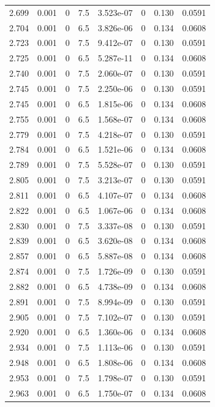 \documentclass[preview]{standalone}
\begin{document}
{{{{{{{{\begin{tabular}{L{1.2cm}C{1.2cm} C{0.3cm}C{0.5cm} C{1.4cm}C{1.4cm} C{1.4cm}C{1.4cm}}
  2.699  &  0.001  & 0     & 7.5 &  3.523e-07  & 0  & 0.130 &  0.0591   \\ 
  2.704  &  0.001  & 0     & 6.5 &  3.826e-06  & 0  & 0.134 &  0.0608   \\ 
  2.723  &  0.001  & 0     & 7.5 &  9.412e-07  & 0  & 0.130 &  0.0591   \\ 
  2.725  &  0.001  & 0     & 6.5 &  5.287e-11  & 0  & 0.134 &  0.0608   \\ 
  2.740  &  0.001  & 0     & 7.5 &  2.060e-07  & 0  & 0.130 &  0.0591   \\ 
  2.745  &  0.001  & 0     & 7.5 &  2.250e-06  & 0  & 0.130 &  0.0591   \\ 
  2.745  &  0.001  & 0     & 6.5 &  1.815e-06  & 0  & 0.134 &  0.0608   \\ 
  2.755  &  0.001  & 0     & 6.5 &  1.568e-07  & 0  & 0.134 &  0.0608   \\ 
  2.779  &  0.001  & 0     & 7.5 &  4.218e-07  & 0  & 0.130 &  0.0591   \\ 
  2.784  &  0.001  & 0     & 6.5 &  1.521e-06  & 0  & 0.134 &  0.0608   \\ 
  2.789  &  0.001  & 0     & 7.5 &  5.528e-07  & 0  & 0.130 &  0.0591   \\ 
  2.805  &  0.001  & 0     & 7.5 &  3.213e-07  & 0  & 0.130 &  0.0591   \\ 
  2.811  &  0.001  & 0     & 6.5 &  4.107e-07  & 0  & 0.134 &  0.0608   \\ 
  2.822  &  0.001  & 0     & 6.5 &  1.067e-06  & 0  & 0.134 &  0.0608   \\ 
  2.830  &  0.001  & 0     & 7.5 &  3.337e-08  & 0  & 0.130 &  0.0591   \\ 
  2.839  &  0.001  & 0     & 6.5 &  3.620e-08  & 0  & 0.134 &  0.0608   \\ 
  2.857  &  0.001  & 0     & 6.5 &  5.887e-08  & 0  & 0.134 &  0.0608   \\ 
  2.874  &  0.001  & 0     & 7.5 &  1.726e-09  & 0  & 0.130 &  0.0591   \\ 
  2.882  &  0.001  & 0     & 6.5 &  4.738e-09  & 0  & 0.134 &  0.0608   \\ 
  2.891  &  0.001  & 0     & 7.5 &  8.994e-09  & 0  & 0.130 &  0.0591   \\ 
  2.905  &  0.001  & 0     & 7.5 &  7.102e-07  & 0  & 0.130 &  0.0591   \\ 
  2.920  &  0.001  & 0     & 6.5 &  1.360e-06  & 0  & 0.134 &  0.0608   \\ 
  2.934  &  0.001  & 0     & 7.5 &  1.113e-06  & 0  & 0.130 &  0.0591   \\ 
  2.948  &  0.001  & 0     & 6.5 &  1.808e-06  & 0  & 0.134 &  0.0608   \\ 
  2.953  &  0.001  & 0     & 7.5 &  1.798e-07  & 0  & 0.130 &  0.0591   \\ 
  2.963  &  0.001  & 0     & 6.5 &  1.750e-07  & 0  & 0.134 &  0.0608   \\ 
\hline 
\end{tabular} 

}}}}}}}}
\end{document}
